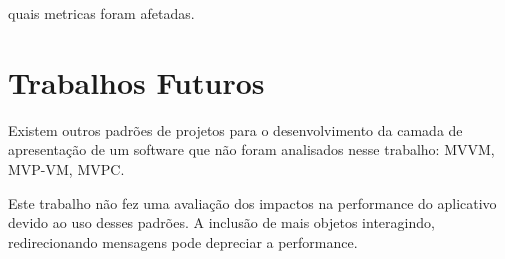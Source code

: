 quais metricas foram afetadas.

\section{Trabalhos Futuros}

Existem outros padrões de projetos para o desenvolvimento da camada de
apresentação de um software que não foram analisados nesse trabalho: MVVM,
MVP-VM, MVPC.

Este trabalho não fez uma avaliação dos impactos na performance do aplicativo
devido ao uso desses padrões. A inclusão de mais objetos interagindo,
redirecionando mensagens pode depreciar a performance.
